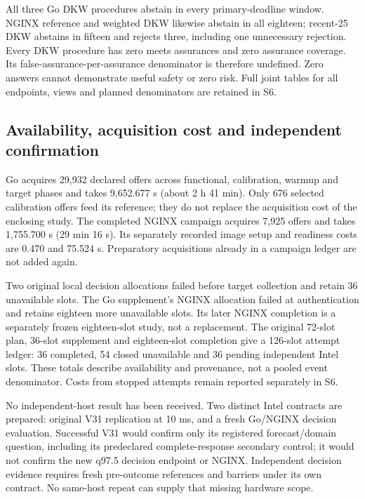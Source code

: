 \documentclass[10pt,a4paper]{article}
\begin{document}
All three Go DKW procedures abstain in every primary-deadline window. NGINX reference and weighted DKW likewise abstain in all eighteen; recent-25 DKW abstains in fifteen and rejects three, including one unnecessary rejection. Every DKW procedure has zero meets assurances and zero assurance coverage. Its false-assurance-per-assurance denominator is therefore undefined. Zero answers cannot demonstrate useful safety or zero risk. Full joint tables for all endpoints, views and planned denominators are retained in S6.

\subsection{Availability, acquisition cost and independent confirmation}

Go acquires 29,932 declared offers across functional, calibration, warmup and target phases and takes 9,652.677 s (about 2 h 41 min). Only 676 selected calibration offers feed its reference; they do not replace the acquisition cost of the enclosing study. The completed NGINX campaign acquires 7,925 offers and takes 1,755.700 s (29 min 16 s). Its separately recorded image setup and readiness costs are 0.470 and 75.524 s. Preparatory acquisitions already in a campaign ledger are not added again.

Two original local decision allocations failed before target collection and retain 36 unavailable slots. The Go supplement's NGINX allocation failed at authentication and retains eighteen more unavailable slots. Its later NGINX completion is a separately frozen eighteen-slot study, not a replacement. The original 72-slot plan, 36-slot supplement and eighteen-slot completion give a 126-slot attempt ledger: 36 completed, 54 closed unavailable and 36 pending independent Intel slots. These totals describe availability and provenance, not a pooled event denominator. Costs from stopped attempts remain reported separately in S6.

No independent-host result has been received. Two distinct Intel contracts are prepared: original V31 replication at 10 ms, and a fresh Go/NGINX decision evaluation. Successful V31 would confirm only its registered forecast/domain question, including its predeclared complete-response secondary control; it would not confirm the new q97.5 decision endpoint or NGINX. Independent decision evidence requires fresh pre-outcome references and barriers under its own contract. No same-host repeat can supply that missing hardware scope.
\end{document}
